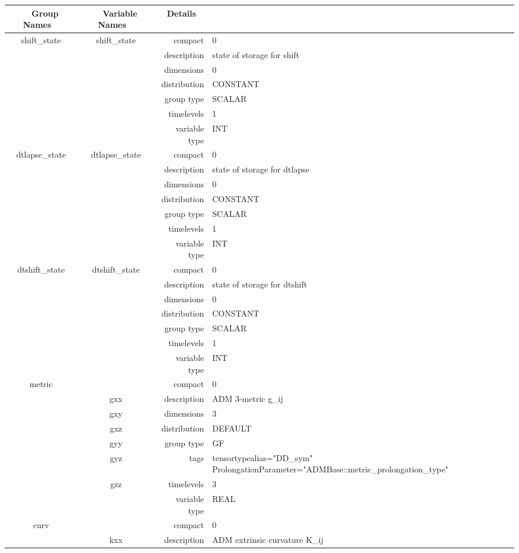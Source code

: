 \begin{tabular*}{150mm}{|c|c@{\extracolsep{\fill}}|rl|} \hline 
~ {\bf Group Names} ~ & ~ {\bf Variable Names} ~  &{\bf Details} ~ & ~\\ 
\hline 
shift\_state & shift\_state & compact & 0 \\ 
 &  & description & state of storage for shift \\ 
 &  & dimensions & 0 \\ 
 &  & distribution & CONSTANT \\ 
 &  & group type & SCALAR \\ 
 &  & timelevels & 1 \\ 
 &  & variable type & INT \\ 
\hline 
dtlapse\_state & dtlapse\_state & compact & 0 \\ 
 &  & description & state of storage for dtlapse \\ 
 &  & dimensions & 0 \\ 
 &  & distribution & CONSTANT \\ 
 &  & group type & SCALAR \\ 
 &  & timelevels & 1 \\ 
 &  & variable type & INT \\ 
\hline 
dtshift\_state & dtshift\_state & compact & 0 \\ 
 &  & description & state of storage for dtshift \\ 
 &  & dimensions & 0 \\ 
 &  & distribution & CONSTANT \\ 
 &  & group type & SCALAR \\ 
 &  & timelevels & 1 \\ 
 &  & variable type & INT \\ 
\hline 
metric &  & compact & 0 \\ 
 & gxx & description & ADM 3-metric g\_ij \\ 
 & gxy & dimensions & 3 \\ 
 & gxz & distribution & DEFAULT \\ 
 & gyy & group type & GF \\ 
 & gyz & tags & tensortypealias="DD\_sym" ProlongationParameter="ADMBase::metric\_prolongation\_type" \\ 
 & gzz & timelevels & 3 \\ 
 &  & variable type & REAL \\ 
\hline 
curv &  & compact & 0 \\ 
 & kxx & description & ADM extrinsic curvature K\_ij \\ 

\end{tabular*}
